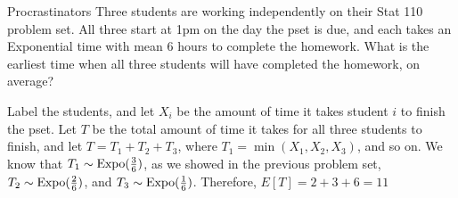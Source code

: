\documentclass[11.5pt]{article}
\begin{document}
\begin{comment}
\begin{solution}{4}
Let $B$ be the event that Bob finishes first, and let $C$ be the event that Claire finishes first. 
\begin{enumerate}
\item We use the law of total probability, conditioning on who finishes first. If Bob finishes first, then Claire must finish before Alice. If Claire finishes first, then Bob must finish before Alice. In either case, by the memoryless property, when Alice steps up to the clerk, the distribution of the amount of time that the other person has to wait is the same as before. 

We have: 

\begin{align*}
P(\text{Alice last}) &= P(\text{Claire finishes before Alice} | B) P(B) \\ &+ P(\text{Bob finishes before Alice} |  A) \cdot P(A) \\ 
&= \frac{\lambda_2}{\lambda_1 + \lambda_2} \cdot \frac{\lambda_1}{\lambda_1+\lambda_2} +\frac{\lambda_1}{\lambda1+\lambda_2}\cdot \frac{\lambda_2}{\lambda_1 + \lambda_2} \\ 
&= \frac{2 \lambda_1 \lambda_2}{(\lambda_1 + \lambda_2)^2}
\end{align*}
\item The amount of time Alice waits in line is the miniumum of 2 exponentials, so it is distributed $\Expo(2 \lambda)$. Then, once she gets to a clerk, her waiting time is $\Expo(\lambda)$. Therefore, the expected total amount of time she spends in the post office is: 

$$ \frac{1}{2 \lambda} + \frac{1}{\lambda} = \frac{3}{2 \lambda}$$
\end{enumerate}
\end{solution}
\end{comment}

\begin{exercise}{Procrastinators}
Three students are working independently on their Stat 110 problem set. All three start at 1pm on the day the pset is due, and each takes an Exponential time with mean 6 hours to complete the homework. What is the earliest time when all three students will have completed the homework, on average? 
\end{exercise}

\begin{solution}{2}
Label the students, and let $X_i$ be the amount of time it takes student $i$ to finish the pset. Let $T$ be the total amount of time it takes for all three students to finish, and let $T = T_1 + T_2 + T_3$, where $T_1 = \min(X_1, X_2,X_3)$, and so on. We know that $T_1 \sim \textrm{Expo}(\frac{3}{6})$, as we showed in the previous problem set, $T_2 \sim \textrm{Expo}(\frac{2}{6})$, and $T_3\sim \textrm{Expo}(\frac{1}{6})$. Therefore, $E[T] = 2 + 3 + 6 =11$
\end{solution}
\end{document}
